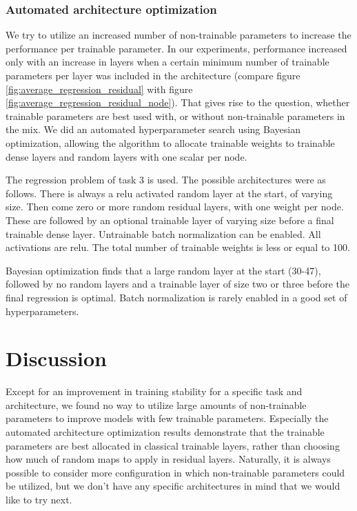 \documentclass[]{article}
\begin{document}
\begin{multicols}{2}
	\subsubsection*{Automated architecture optimization}
	We try to utilize an increased number of non-trainable parameters to increase the performance per trainable parameter. In our experiments, performance increased only with an increase in layers when a certain minimum number of trainable parameters per layer was included in the architecture (compare figure \ref{fig:average_regression_residual} with figure \ref{fig:average_regression_residual_node}). That gives rise to the question, whether trainable parameters are best used with, or without non-trainable parameters in the mix. We did an automated hyperparameter search using Bayesian optimization, allowing the algorithm to allocate trainable weights to trainable dense layers and random layers with one scalar per node.
	
	The regression problem of task 3 is used. The possible architectures were as follows. There is always a relu activated random layer at the start, of varying size. Then come zero or more random residual layers, with one weight per node. These are followed by an optional trainable layer of varying size before a final trainable dense layer. Untrainable batch normalization can be enabled. All activations are relu. The total number of trainable weights is less or equal to 100.
	
	Bayesian optimization finds that a large random layer at the start (30-47), followed by no random layers and a trainable layer of size two or three before the final regression is optimal. Batch normalization is rarely enabled in a good set of hyperparameters.
	
	\section{Discussion}
	Except for an improvement in training stability for a specific task and architecture, we found no way to utilize large amounts of non-trainable parameters to improve models with few trainable parameters. Especially the automated architecture optimization results demonstrate that the trainable parameters are best allocated in classical trainable layers, rather than choosing how much of random maps to apply in residual layers. Naturally, it is always possible to consider more configuration in which non-trainable parameters could be utilized, but we don't have any specific architectures in mind that we would like to try next.
	

\end{multicols}
\end{document}
